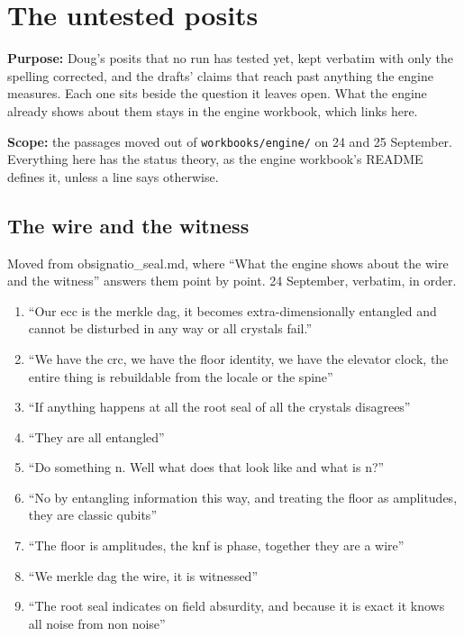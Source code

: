 \chapter{\texorpdfstring{The untested posits}{The untested posits}}
\label{chap:posits-24-september}

\textbf{Purpose:} Doug's posits that no run has tested yet, kept verbatim with only the spelling corrected, and the drafts' claims that reach past anything the engine measures. Each one sits beside the question it leaves open. What the engine already shows about them stays in the engine workbook, which links here.

\textbf{Scope:} the passages moved out of \texttt{workbooks/\allowbreak{}engine/\allowbreak{}} on 24 and 25 September. Everything here has the status theory, as the engine workbook's README defines it, unless a line says otherwise.

\section{\texorpdfstring{The wire and the witness}{The wire and the witness}}

Moved from obsignatio\_\allowbreak{}seal.md, where “What the engine shows about the wire and the witness” answers them point by point. 24 September, verbatim, in order.

\begin{enumerate}
\item “Our ecc is the merkle dag, it becomes extra-dimensionally entangled and cannot be disturbed in any way or all crystals fail.”
\item “We have the crc, we have the floor identity, we have the elevator clock, the entire thing is rebuildable from the locale or the spine”
\item “If anything happens at all the root seal of all the crystals disagrees”
\item “They are all entangled”
\item “Do something n. Well what does that look like and what is n?”
\item “No by entangling information this way, and treating the floor as amplitudes, they are classic qubits”
\item “The floor is amplitudes, the knf is phase, together they are a wire”
\item “We merkle dag the wire, it is witnessed”
\item “The root seal indicates on field absurdity, and because it is exact it knows all noise from non noise”

\end{enumerate}

